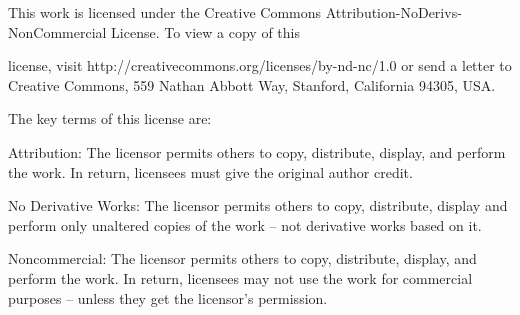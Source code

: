 \documentclass[a4paper,11pt]{book}
\begin{document}
\noindent  

\noindent  

\noindent  

\noindent 

\noindent 

\noindent 

\noindent This work is licensed under the Creative Commons Attribution-NoDerivs-NonCommercial License. To view a copy of this

\noindent license, visit http://creativecommons.org/licenses/by-nd-nc/1.0 or send a letter to Creative Commons, 559 Nathan Abbott Way, Stanford, California 94305, USA.

\noindent 

\noindent The key terms of this license are:

\noindent 

\noindent Attribution: The licensor permits others to copy, distribute, display, and perform the work. In return, licensees must give the original author credit.

\noindent 

\noindent No  Derivative  Works: The licensor permits others to copy, distribute, display and perform only unaltered copies of the work -- not derivative works based on it.

\noindent 

\noindent Noncommercial: The licensor permits others to copy, distribute, display, and perform the work. In return, licensees may not use the work for commercial purposes -- unless they get the licensor's permission.
\end{document}
